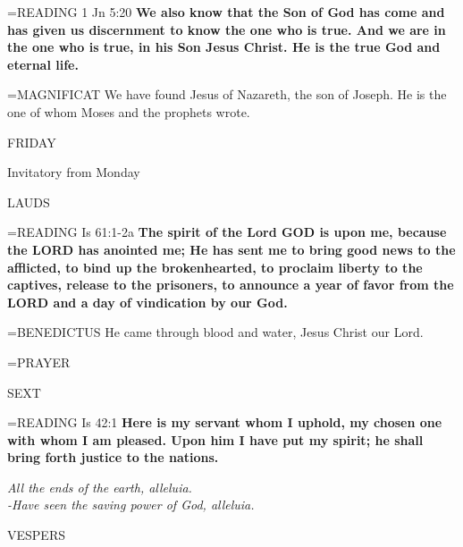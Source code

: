 \hangindent=\parindent \small{\uppercase{READING}}    1 Jn 5:20 \textbf{   We also know that the Son of God has come and has given us discernment to know the one who is true. And we are in the one who is true, in his Son Jesus Christ. He is the true God and eternal life.\\}

\hangindent=\parindent \small{MAGNIFICAT 	We have found Jesus of Nazareth, the son of Joseph. He is the one of whom Moses and the prophets wrote.\\}

\begin{center}
\normalsize FRIDAY
\end{center}

Invitatory from Monday

\begin{flushleft}\normalsize LAUDS\\\end{flushleft}

\hangindent=\parindent \small{\uppercase{READING}}    Is 61:1-2a \textbf{   The spirit of the Lord GOD is upon me, because the LORD has anointed me; He has sent me to bring good news to the afflicted, to bind up the brokenhearted, to proclaim liberty to the captives, release to the prisoners, to announce a year of favor from the LORD and a day of vindication by our God.\\}

\hangindent=\parindent \small{BENEDICTUS 	He came through blood and water, Jesus Christ our Lord.\\}

\hangindent=\parindent \small{PRAYER 	}

\begin{flushleft}\normalsize SEXT\\\end{flushleft}

\hangindent=\parindent \small{\uppercase{READING}}    Is 42:1 \textbf{   Here is my servant whom I uphold, my chosen one with whom I am pleased. Upon him I have put my spirit; he shall bring forth justice to the nations.\\}

\begin{center}
\textit{All the ends of the earth, alleluia.\\
-Have seen the saving power of God, alleluia.}
\end{center}

\begin{flushleft}\normalsize VESPERS\\\end{flushleft}


